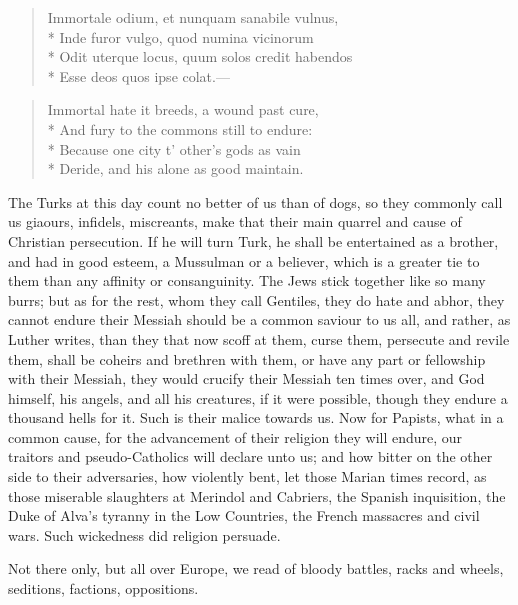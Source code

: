 {\begin{latin}
\begin{verse}
Immortale odium, et nunquam sanabile vulnus,\\*
Inde furor vulgo, quod numina vicinorum\\*
Odit uterque locus, quum solos credit habendos\\*
Esse deos quos ipse colat.---
\end{verse}
\end{latin}

\begin{verse}
Immortal hate it breeds, a wound past cure,\\*
And fury to the commons still to endure:\\*
Because one city t' other's gods as vain\\*
Deride, and his alone as good maintain.
\end{verse}

The Turks at this day count no better of us than of dogs, so they
commonly call us giaours, infidels, miscreants, make that their main
quarrel and cause of Christian persecution. If he will turn Turk, he
shall be entertained as a brother, and had in good esteem, a Mussulman
or a believer, which is a greater tie to them than any affinity or
consanguinity. The Jews stick together like so many burrs; but as for
the rest, whom they call Gentiles, they do hate and abhor, they cannot
endure their Messiah should be a common saviour to us all, and rather,
as Luther writes, than they that now scoff at them, curse them,
persecute and revile them, shall be coheirs and brethren with them, or
have any part or fellowship with their Messiah, they would crucify
their Messiah ten times over, and God himself, his angels, and all his
creatures, if it were possible, though they endure a thousand hells for
it. Such is their malice towards us. Now for Papists, what in a common
cause, for the advancement of their religion they will endure, our
traitors and pseudo-Catholics will declare unto us; and how bitter on
the other side to their adversaries, how violently bent, let those
Marian times record, as those miserable slaughters at Merindol and
Cabriers, the Spanish inquisition, the Duke of Alva's tyranny in the
Low Countries, the French massacres and civil wars.  Such wickedness did religion persuade.

Not there only, but all over Europe, we read of bloody battles, racks
and wheels, seditions, factions, oppositions.

}
